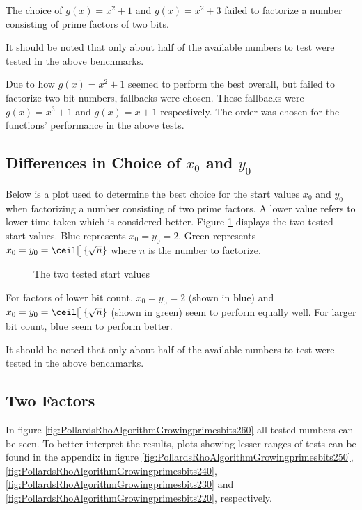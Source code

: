 The choice of $g(x)=x^2+1$ and $g(x)=x^2+3$ failed to factorize a number consisting of prime factors of two bits.

It should be noted that only about half of the available numbers to test were tested in the above benchmarks.

Due to how $g(x)=x^2+1$ seemed to perform the best overall, but failed to factorize two bit numbers, fallbacks were chosen. These fallbacks were $g(x)=x^3+1$ and $g(x)=x+1$ respectively. The order was chosen for the functions' performance in the above tests.

\subsection{Differences in Choice of $x_0$ and $y_0$}

Below is a plot used to determine the best choice for the start values $x_0$ and $y_0$ when factorizing a number consisting of two prime factors. A lower value refers to lower time taken which is considered better. Figure \ref{fig:pollardsStart} displays the two tested start values. Blue represents $x_0=y_0=2$. Green represents $x_0=y_0=\ceil[\big]{\sqrt{n}}$ where $n$ is the number to factorize.

\begin{figure}[H]
    \centering
    
    \vspace{-0.3cm}
    \caption{The two tested start values}\label{fig:pollardsStart}
\end{figure}

For factors of lower bit count, $x_0=y_0=2$ (shown in blue) and $x_0=y_0=\ceil[\big]{\sqrt{n}}$ (shown in green) seem to perform equally well. For larger bit count, blue seem to perform better.

It should be noted that only about half of the available numbers to test were tested in the above benchmarks.

\subsection{Two Factors}



In figure \ref{fig:PollardsRhoAlgorithmGrowingprimesbits260} all tested numbers can be seen. To better interpret the results, plots showing lesser ranges of tests can be found in the appendix in figure \ref{fig:PollardsRhoAlgorithmGrowingprimesbits250}, \ref{fig:PollardsRhoAlgorithmGrowingprimesbits240}, \ref{fig:PollardsRhoAlgorithmGrowingprimesbits230} and \ref{fig:PollardsRhoAlgorithmGrowingprimesbits220}, respectively.

